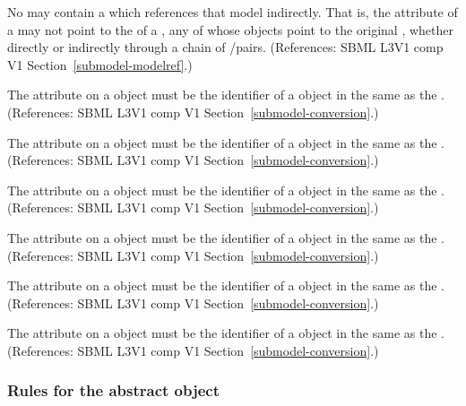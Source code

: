 \begin{sbmlenum}
 { No \Model may contain a \Submodel which references
  that model indirectly.  That is, the  attribute of a
  \Submodel may
  not point to the  of a \Model, any of whose \Submodel objects
  point to the original
  \Model, whether directly or indirectly through a chain of
  \Model/\Submodel pairs. 
  (References: SBML L3V1 comp V1 Section~\ref{submodel-modelref}.) }

 { The  attribute
   on a \Submodel object must be the identifier of a \Parameter object in the 
   same \Model as the \Submodel.
  (References: SBML L3V1 comp V1 Section~\ref{submodel-conversion}.) }


 { The  attribute
   on a \Submodel object must be the identifier of a \Parameter object in the 
   same \Model as the \Submodel.
  (References: SBML L3V1 comp V1 Section~\ref{submodel-conversion}.) }


 { The  attribute
   on a \Submodel object must be the identifier of a \Parameter object in the 
   same \Model as the \Submodel.
  (References: SBML L3V1 comp V1 Section~\ref{submodel-conversion}.) }


 { The  attribute
   on a \Submodel object must be the identifier of a \Parameter object in the 
   same \Model as the \Submodel.
  (References: SBML L3V1 comp V1 Section~\ref{submodel-conversion}.) }


 { The  attribute
   on a \Submodel object must be the identifier of a \Parameter object in the 
   same \Model as the \Submodel.
  (References: SBML L3V1 comp V1 Section~\ref{submodel-conversion}.) }

 { The  attribute
   on a \Submodel object must be the identifier of a \Parameter object in the 
   same \Model as the \Submodel.
  (References: SBML L3V1 comp V1 Section~\ref{submodel-conversion}.) }


\end{sbmlenum} \subsubsection*{Rules for the  abstract object} \begin{sbmlenum}


\end{sbmlenum}
